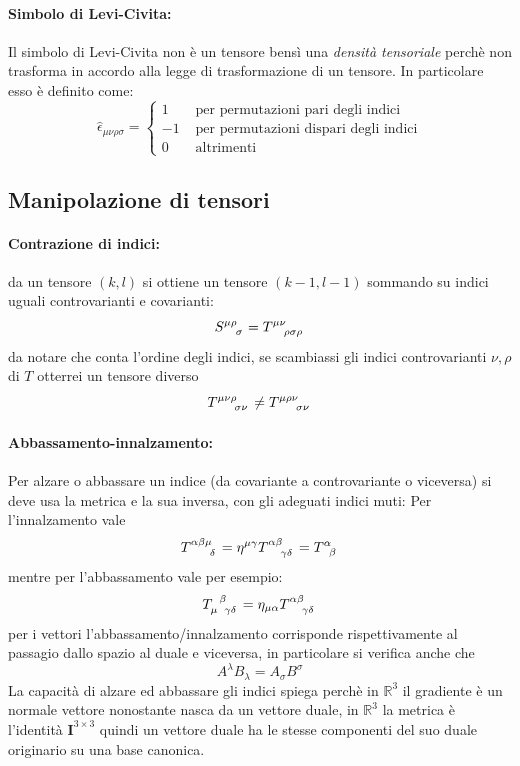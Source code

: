 \documentclass[twoside]{article}
\begin{document}
\paragraph{Simbolo di Levi-Civita:}
Il simbolo di Levi-Civita non è un tensore bensì una \emph{densità tensoriale} perchè non trasforma in accordo alla legge di trasformazione di un tensore.
In particolare esso è definito come:
\begin{equation}
	\hat{\epsilon}_{\mu \nu \rho \sigma} =
\left\{ \begin{matrix}
	1 &\textrm{ per permutazioni pari degli indici} \\
	-1 &\textrm{ per permutazioni dispari degli indici} \\
	0 &\textrm{ altrimenti}
\end{matrix}\right.
\end{equation}
\subsection{Manipolazione di tensori}
\paragraph{Contrazione di indici:} da un tensore $(k,l)$ si ottiene un tensore $(k-1,l-1)$ sommando su indici uguali controvarianti e covarianti:
$$
 S\indices{^\mu^\rho_\sigma} = T\indices{^\mu^\nu_\rho_\sigma_\rho}
$$
da notare che conta l'ordine degli indici, se scambiassi gli indici controvarianti $\nu,\rho$ di $T$ otterrei un tensore diverso
$$
T\indices{^\mu^\nu^\rho_\sigma_\nu} \neq T\indices{^\mu^\rho^\nu_\sigma_\nu}
$$

\paragraph{Abbassamento-innalzamento:} Per alzare o abbassare un indice (da covariante a controvariante o viceversa) si deve usa la metrica e la sua inversa, con gli adeguati indici muti:
Per l'innalzamento vale
$$
  T\indices{^\alpha^\beta^\mu_\delta} = \eta\indices{^\mu^\gamma} T\indices{^\alpha^\beta_\gamma_\delta} = T\indices{^\alpha_\beta}
$$ 
mentre per l'abbassamento vale per esempio:
$$
T\indices{_\mu^\beta_\gamma_\delta} = \eta_{\mu\alpha} T\indices{^\alpha^\beta_\gamma_\delta}
$$
per i vettori l'abbassamento/innalzamento corrisponde rispettivamente al passagio dallo spazio al duale e viceversa, in particolare si verifica anche che 
$$
A^\lambda B_\lambda = A_\sigma B^\sigma
$$
La capacità di alzare ed abbassare gli indici spiega perchè in $\mathbb{R}^3$ il gradiente è un normale vettore nonostante nasca da un vettore duale, in $\mathbb{R}^3$ la metrica è l'identità $\mathbf{I}^{3\times3}$
quindi un vettore duale ha le stesse componenti del suo duale originario su una base canonica.
\end{document}
